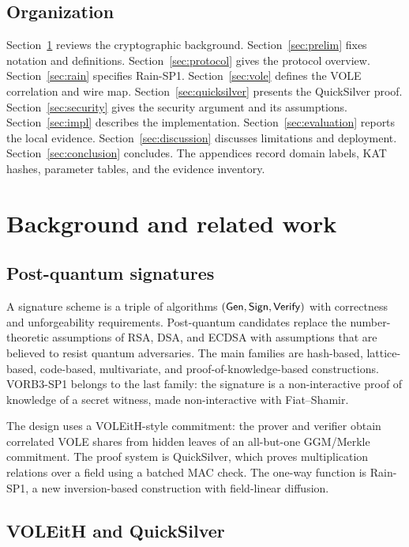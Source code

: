 \documentclass[11pt,a4paper]{article}
\begin{document}
\subsection{Organization}

Section~\ref{sec:background} reviews the cryptographic background.
Section~\ref{sec:prelim} fixes notation and definitions.
Section~\ref{sec:protocol} gives the protocol overview.
Section~\ref{sec:rain} specifies Rain-SP1.
Section~\ref{sec:vole} defines the VOLE correlation and wire map.
Section~\ref{sec:quicksilver} presents the QuickSilver proof.
Section~\ref{sec:security} gives the security argument and its assumptions.
Section~\ref{sec:impl} describes the implementation.
Section~\ref{sec:evaluation} reports the local evidence.
Section~\ref{sec:discussion} discusses limitations and deployment.
Section~\ref{sec:conclusion} concludes.
The appendices record domain labels, KAT hashes, parameter tables, and the
evidence inventory.

\section{Background and related work}
\label{sec:background}

\subsection{Post-quantum signatures}

A signature scheme is a triple of algorithms $(\mathsf{Gen},\mathsf{Sign},\mathsf{Verify})$ with
correctness and unforgeability requirements. Post-quantum candidates replace
the number-theoretic assumptions of RSA, DSA, and ECDSA with assumptions that
are believed to resist quantum adversaries. The main families are hash-based,
lattice-based, code-based, multivariate, and proof-of-knowledge-based
constructions. VORB3-SP1 belongs to the last family: the signature is a
non-interactive proof of knowledge of a secret witness, made non-interactive
with Fiat--Shamir.

The design uses a VOLEitH-style commitment: the prover and verifier obtain
correlated VOLE shares from hidden leaves of an all-but-one GGM/Merkle
commitment. The proof system is QuickSilver, which proves multiplication
relations over a field using a batched MAC check. The one-way function is
Rain-SP1, a new inversion-based construction with field-linear diffusion.

\subsection{VOLEitH and QuickSilver}
\end{document}
